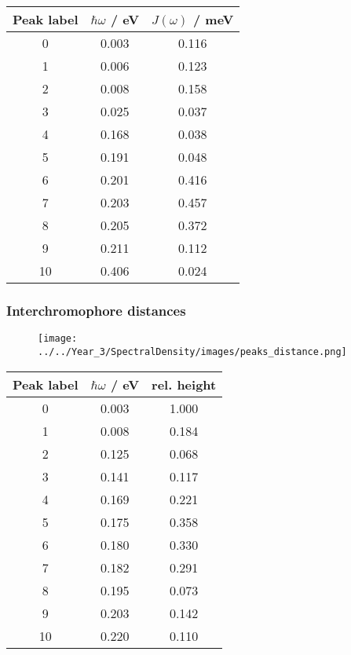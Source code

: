 \begin{table}
    \centering
    \begin{tabular}{||c c c||}
    \hline
    Peak label & $\hbar \omega$ / eV & $J\left(\omega\right)$ / meV \\
    \hline\hline
    
     0 & 0.003 & 0.116 \\
     1 & 0.006 & 0.123 \\
     2 & 0.008 & 0.158 \\
     3 & 0.025 & 0.037 \\
     4 & 0.168 & 0.038 \\
     5 & 0.191 & 0.048 \\
     6 & 0.201 & 0.416 \\
     7 & 0.203 & 0.457 \\
     8 & 0.205 & 0.372 \\
     9 & 0.211 & 0.112 \\
     10 & 0.406 & 0.024 \\
    \hline 
    \end{tabular}
    \end{table}

\afterpartskip
\subsubsection{Interchromophore distances}
\label{subsubsec:specdens_distances}

\begin{figure}
    \centering
    \texttt{[image: ../../Year\_3/SpectralDensity/images/peaks\_distance.png]}
\end{figure}


\begin{table}
    \centering
    \begin{tabular}{||c c c||}
    \hline
    Peak label & $\hbar \omega$ / eV & rel. height \\
    \hline\hline
    
     0 & 0.003 & 1.000 \\
     1 & 0.008 & 0.184 \\
     2 & 0.125 & 0.068 \\
     3 & 0.141 & 0.117 \\
     4 & 0.169 & 0.221 \\
     5 & 0.175 & 0.358 \\
     6 & 0.180 & 0.330 \\
     7 & 0.182 & 0.291 \\
     8 & 0.195 & 0.073 \\
     9 & 0.203 & 0.142 \\
     10 & 0.220 & 0.110 \\
    \hline 
    \end{tabular}
\end{table}

